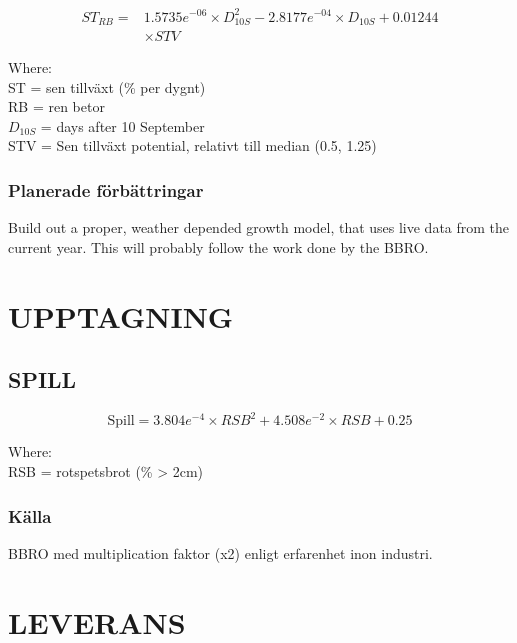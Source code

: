 \documentclass[fleqn]{article}
\begin{document}
    \begin{align}
      ST_{RB} = & 1.5735e^{-06} \times D^2_{10S} - 2.8177e^{-04} \times D_{10S} + 0.01244\\
      &\times {STV}
    \end{align}
    
    Where:\\
    \hangindent=1.5cm
    ST = sen tillväxt (\% per dygnt)\\
    RB = ren betor \\
    $D_{10S}$ = days after 10 September\\
    STV = Sen tillväxt potential, relativt till median (0.5, 1.25)

    \subsubsection{Planerade förbättringar}
    Build out a proper, weather depended growth model, that uses live data from the current year. This will probably follow the work done by the BBRO.


\pagebreak
\section{UPPTAGNING}

\subsection{SPILL}

  \begin{equation}
  \text{Spill} = 3.804e^{-4} \times RSB^2 + 4.508e^{-2} \times RSB + 0.25
  \end{equation}
  
  Where:\\
  \hangindent=1.5cm
  RSB = rotspetsbrot (\% > 2cm)\\
  
  \subsubsection{Källa}
  BBRO med multiplication faktor (x2) enligt erfarenhet inon industri.
  



\pagebreak
\section{LEVERANS}
\end{document}
